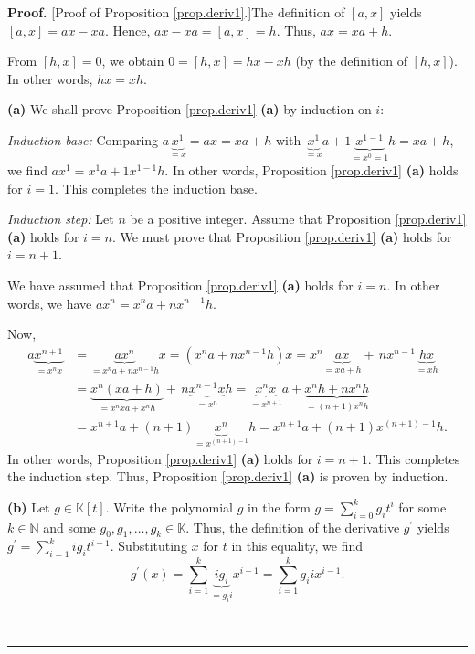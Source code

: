 \documentclass[numbers=enddot,12pt,final,onecolumn,notitlepage]{scrartcl}%
\theoremstyle{definition}
\newenvironment{proof}[1][Proof]{\noindent\textbf{#1.} }{\ \rule{0.5em}{0.5em}}
\let\sumnonlimits\sum
\renewcommand{\sum}{\sumnonlimits\limits}
\begin{document}
\begin{proof}
[Proof of Proposition \ref{prop.deriv1}.]The definition of $\left[
a,x\right]  $ yields $\left[  a,x\right]  =ax-xa$. Hence, $ax-xa=\left[
a,x\right]  =h$. Thus, $ax=xa+h$.

From $\left[  h,x\right]  =0$, we obtain $0=\left[  h,x\right]  =hx-xh$ (by
the definition of $\left[  h,x\right]  $). In other words, $hx=xh$.

\textbf{(a)} We shall prove Proposition \ref{prop.deriv1} \textbf{(a)} by
induction on $i$:

\textit{Induction base:} Comparing $a\underbrace{x^{1}}_{=x}=ax=xa+h$ with
$\underbrace{x^{1}}_{=x}a+1\underbrace{x^{1-1}}_{=x^{0}=1}h=xa+h$, we find
$ax^{1}=x^{1}a+1x^{1-1}h$. In other words, Proposition \ref{prop.deriv1}
\textbf{(a)} holds for $i=1$. This completes the induction base.

\textit{Induction step:} Let $n$ be a positive integer. Assume that
Proposition \ref{prop.deriv1} \textbf{(a)} holds for $i=n$. We must prove that
Proposition \ref{prop.deriv1} \textbf{(a)} holds for $i=n+1$.

We have assumed that Proposition \ref{prop.deriv1} \textbf{(a)} holds for
$i=n$. In other words, we have $ax^{n}=x^{n}a+nx^{n-1}h$.

Now,
\begin{align*}
a\underbrace{x^{n+1}}_{=x^{n}x}  &  =\underbrace{ax^{n}}_{=x^{n}a+nx^{n-1}%
h}x=\left(  x^{n}a+nx^{n-1}h\right)  x=x^{n}\underbrace{ax}_{=xa+h}%
+\,nx^{n-1}\underbrace{hx}_{=xh}\\
&  =\underbrace{x^{n}\left(  xa+h\right)  }_{=x^{n}xa+x^{n}h}%
+\,n\underbrace{x^{n-1}x}_{=x^{n}}h=\underbrace{x^{n}x}_{=x^{n+1}%
}a+\underbrace{x^{n}h+nx^{n}h}_{=\left(  n+1\right)  x^{n}h}\\
&  =x^{n+1}a+\left(  n+1\right)  \underbrace{x^{n}}_{=x^{\left(  n+1\right)
-1}}h=x^{n+1}a+\left(  n+1\right)  x^{\left(  n+1\right)  -1}h.
\end{align*}
In other words, Proposition \ref{prop.deriv1} \textbf{(a)} holds for $i=n+1$.
This completes the induction step. Thus, Proposition \ref{prop.deriv1}
\textbf{(a)} is proven by induction.

\textbf{(b)} Let $g\in\mathbb{K}\left[  t\right]  $. Write the polynomial $g$
in the form $g=\sum_{i=0}^{k}g_{i}t^{i}$ for some $k\in\mathbb{N}$ and some
$g_{0},g_{1},\ldots,g_{k}\in\mathbb{K}$. Thus, the definition of the
derivative $g^{\prime}$ yields $g^{\prime}=\sum_{i=1}^{k}ig_{i}t^{i-1}$.
Substituting $x$ for $t$ in this equality, we find%
\begin{equation}
g^{\prime}\left(  x\right)  =\sum_{i=1}^{k}\underbrace{ig_{i}}_{=g_{i}%
i}x^{i-1}=\sum_{i=1}^{k}g_{i}ix^{i-1}. \label{pf.prop.deriv1.b.g'(x)}%
\end{equation}



\end{proof}
\end{document}
